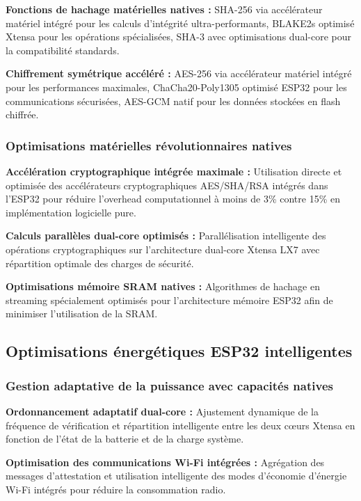 \begin{algorithm}
\textbf{Fonctions de hachage matérielles natives :} SHA-256 via accélérateur matériel intégré pour les calculs d'intégrité ultra-performants, BLAKE2s optimisé Xtensa pour les opérations spécialisées, SHA-3 avec optimisations dual-core pour la compatibilité standards.

\textbf{Chiffrement symétrique accéléré :} AES-256 via accélérateur matériel intégré pour les performances maximales, ChaCha20-Poly1305 optimisé ESP32 pour les communications sécurisées, AES-GCM natif pour les données stockées en flash chiffrée.

\subsubsection{Optimisations matérielles révolutionnaires natives}

\textbf{Accélération cryptographique intégrée maximale :} Utilisation directe et optimisée des accélérateurs cryptographiques AES/SHA/RSA intégrés dans l'ESP32 pour réduire l'overhead computationnel à moins de 3\% contre 15\% en implémentation logicielle pure.

\textbf{Calculs parallèles dual-core optimisés :} Parallélisation intelligente des opérations cryptographiques sur l'architecture dual-core Xtensa LX7 avec répartition optimale des charges de sécurité.

\textbf{Optimisations mémoire SRAM natives :} Algorithmes de hachage en streaming spécialement optimisés pour l'architecture mémoire ESP32 afin de minimiser l'utilisation de la SRAM.

\subsection{Optimisations énergétiques ESP32 intelligentes}

\subsubsection{Gestion adaptative de la puissance avec capacités natives}

\textbf{Ordonnancement adaptatif dual-core :} Ajustement dynamique de la fréquence de vérification et répartition intelligente entre les deux cœurs Xtensa en fonction de l'état de la batterie et de la charge système.

\textbf{Optimisation des communications Wi-Fi intégrées :} Agrégation des messages d'attestation et utilisation intelligente des modes d'économie d'énergie Wi-Fi intégrés pour réduire la consommation radio.


\end{algorithm}
